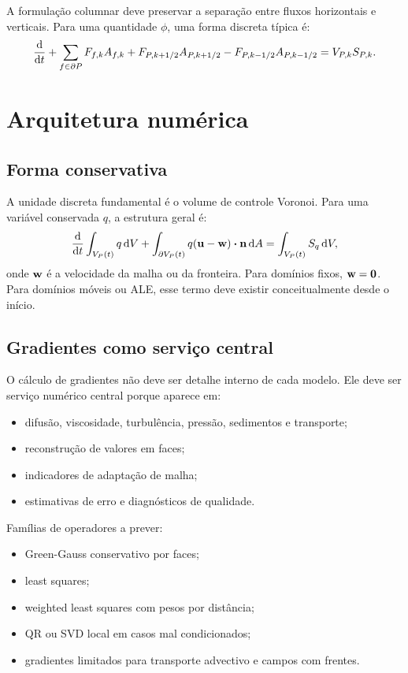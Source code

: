 \documentclass[11pt,a4paper]{article}
\begin{document}
A formula\c{c}\~ao columnar deve preservar a separa\c{c}\~ao entre fluxos horizontais e verticais. Para uma quantidade \(\phi\), uma forma discreta t\'ipica \'e:
\[
\dv{}{t}(V_{P,k}\phi_{P,k})
+
\sum_{f\in\partial P} F_{f,k}A_{f,k}
+
F_{P,k+1/2}A_{P,k+1/2}
-
F_{P,k-1/2}A_{P,k-1/2}
=
V_{P,k}S_{P,k}.
\]

\section{Arquitetura num\'erica}

\subsection{Forma conservativa}

A unidade discreta fundamental \'e o volume de controle Voronoi. Para uma vari\'avel conservada \(q\), a estrutura geral \'e:
\[
\dv{}{t}\int_{V_P(t)}q\,\dd V
+
\int_{\partial V_P(t)} q(\vb{u}-\vb{w})\vdot\vb{n}\,\dd A
=
\int_{V_P(t)}S_q\,\dd V,
\]
onde \(\vb{w}\) \'e a velocidade da malha ou da fronteira. Para dom\'inios fixos, \(\vb{w}=\vb{0}\). Para dom\'inios m\'oveis ou ALE, esse termo deve existir conceitualmente desde o in\'icio.

\subsection{Gradientes como servi\c{c}o central}

O c\'alculo de gradientes n\~ao deve ser detalhe interno de cada modelo. Ele deve ser servi\c{c}o num\'erico central porque aparece em:
\begin{itemize}
  \item difus\~ao, viscosidade, turbul\^encia, press\~ao, sedimentos e transporte;
  \item reconstru\c{c}\~ao de valores em faces;
  \item indicadores de adapta\c{c}\~ao de malha;
  \item estimativas de erro e diagn\'osticos de qualidade.
\end{itemize}

Fam\'ilias de operadores a prever:
\begin{itemize}
  \item Green-Gauss conservativo por faces;
  \item least squares;
  \item weighted least squares com pesos por dist\^ancia;
  \item QR ou SVD local em casos mal condicionados;
  \item gradientes limitados para transporte advectivo e campos com frentes.
\end{itemize}
\end{document}
